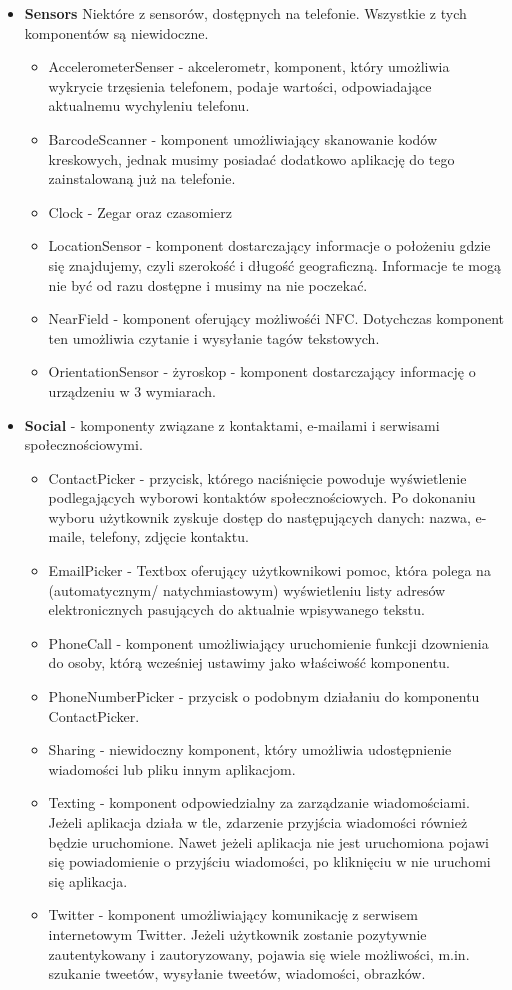 \begin{itemize}
\item \textbf{Sensors} Niektóre z sensorów, dostępnych na telefonie. Wszystkie z tych komponentów są niewidoczne.
\begin{itemize}
\item AccelerometerSenser - akcelerometr, komponent, który umożliwia wykrycie trzęsienia telefonem, podaje wartości, odpowiadające aktualnemu wychyleniu telefonu.
\item BarcodeScanner - komponent umożliwiający skanowanie kodów kreskowych, jednak musimy posiadać dodatkowo aplikację do tego zainstalowaną już na telefonie.
\item Clock - Zegar oraz czasomierz
\item LocationSensor - komponent dostarczający informacje o położeniu gdzie się znajdujemy, czyli szerokość i długość geograficzną. Informacje te mogą nie być od razu dostępne i musimy na nie poczekać.
\item NearField - komponent oferujący możliwośći NFC. Dotychczas komponent ten umożliwia czytanie i wysyłanie tagów tekstowych.
\item OrientationSensor - żyroskop - komponent dostarczający informację o urządzeniu w 3 wymiarach.
\end{itemize}

\item \textbf{Social} - komponenty związane z kontaktami, e-mailami i serwisami społecznościowymi.
\begin{itemize}
\item ContactPicker - przycisk, którego naciśnięcie powoduje wyświetlenie podlegających wyborowi kontaktów społecznościowych. Po dokonaniu wyboru użytkownik zyskuje dostęp do następujących danych: nazwa, e-maile, telefony, zdjęcie kontaktu.
\item EmailPicker - Textbox oferujący użytkownikowi pomoc, która polega na (automatycznym/ natychmiastowym) wyświetleniu listy adresów elektronicznych pasujących do aktualnie wpisywanego tekstu.
\item PhoneCall - komponent umożliwiający uruchomienie funkcji dzownienia do osoby, którą wcześniej ustawimy jako właściwość komponentu.
\item PhoneNumberPicker - przycisk o podobnym działaniu do komponentu ContactPicker.
\item Sharing - niewidoczny komponent, który umożliwia udostępnienie wiadomości lub pliku innym aplikacjom.
\item Texting - komponent odpowiedzialny za zarządzanie wiadomościami. Jeżeli aplikacja działa w tle, zdarzenie przyjścia wiadomości również będzie uruchomione. Nawet jeżeli aplikacja nie jest uruchomiona pojawi się powiadomienie o przyjściu wiadomości, po kliknięciu w nie uruchomi się aplikacja.
\item Twitter - komponent umożliwiający komunikację z serwisem internetowym Twitter. Jeżeli użytkownik zostanie pozytywnie zautentykowany i zautoryzowany, pojawia się wiele możliwości, m.in. szukanie tweetów, wysyłanie tweetów, wiadomości, obrazków.
\end{itemize}


\end{itemize}
